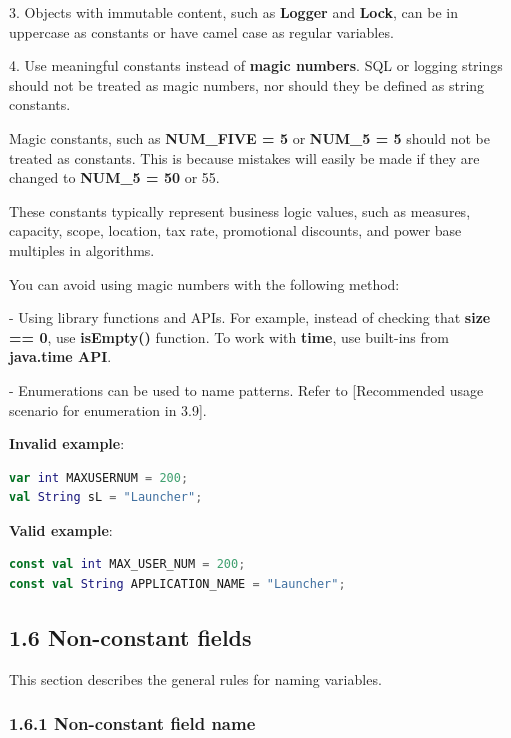 3. Objects with immutable content, such as \textbf{Logger} and \textbf{Lock}, can be in uppercase as constants or have camel case as regular variables.

4. Use meaningful constants instead of \textbf{magic numbers}. SQL or logging strings should not be treated as magic numbers, nor should they be defined as string constants.

Magic constants, such as \textbf{NUM\_FIVE = 5} or \textbf{NUM\_5 = 5} should not be treated as constants. This is because mistakes will easily be made if they are changed to \textbf{NUM\_5 = 50} or 55.

These constants typically represent business logic values, such as measures, capacity, scope, location, tax rate, promotional discounts, and power base multiples in algorithms.

You can avoid using magic numbers with the following method:

- Using library functions and APIs. For example, instead of checking that \textbf{size == 0}, use \textbf{isEmpty()} function. To work with \textbf{time}, use built-ins from \textbf{java.time API}.

- Enumerations can be used to name patterns. Refer to [Recommended usage scenario for enumeration in 3.9].



\textbf{Invalid example}: 



\begin{lstlisting}[language=Kotlin]
var int MAXUSERNUM = 200;
val String sL = "Launcher";
\end{lstlisting}


\textbf{Valid example}:



\begin{lstlisting}[language=Kotlin]
const val int MAX_USER_NUM = 200;
const val String APPLICATION_NAME = "Launcher";
\end{lstlisting}


\subsection*{\textbf{1.6 Non-constant fields}}

\label{sec:1.6}

This section describes the general rules for naming variables.

\subsubsection*{\textbf{1.6.1 Non-constant field name}}
\leavevmode\newline

